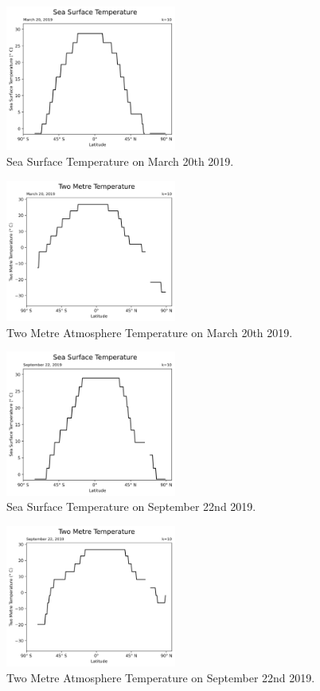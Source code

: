 \documentclass[conference,compsoc]{IEEEtran}
\begin{document}
\begin{figure}[htbp]
    \centerline{\includegraphics[width=0.5\textwidth]{figures/fig7.png}}
    \caption{Sea Surface Temperature on March 20th 2019.}
    \label{fig7}
\end{figure}
\begin{figure}[htbp]
    \centerline{\includegraphics[width=0.5\textwidth]{figures/fig8.png}}
    \caption{Two Metre Atmosphere Temperature on March 20th 2019.}
    \label{fig8}
\end{figure}
\begin{figure}[htbp]
    \centerline{\includegraphics[width=0.5\textwidth]{figures/fig9.png}}
    \caption{Sea Surface Temperature on September 22nd 2019.}
    \label{fig9}
\end{figure}
\begin{figure}[htbp]
    \centerline{\includegraphics[width=0.5\textwidth]{figures/fig10.png}}
    \caption{Two Metre Atmosphere Temperature on September 22nd 2019.}
    \label{fig10}
\end{figure}
\end{document}
